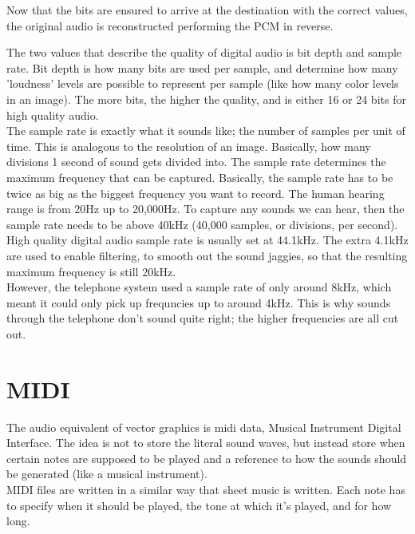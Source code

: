 Now that the bits are ensured to arrive at the destination with the correct values, the original audio is reconstructed performing the PCM in reverse.

\begin{center}\end{center}

The two values that describe the quality of digital audio is bit depth and sample rate. Bit depth is how many bits are used per sample, and determine how many 'loudness' levels are possible to represent per sample (like how many color levels in an image). The more bits, the higher the quality, and is either 16 or 24 bits for high quality audio.\\

The sample rate is exactly what it sounds like; the number of samples per unit of time. This is analogous to the resolution of an image. Basically, how many divisions 1 second of sound gets divided into. The sample rate determines the maximum frequency that can be captured. Basically, the sample rate has to be twice as big as the biggest frequency you want to record. The human hearing range is from 20Hz up to 20,000Hz. To capture any sounds we can hear, then the sample rate needs to be above 40kHz (40,000 samples, or divisions, per second). High quality digital audio sample rate is usually set at 44.1kHz. The extra 4.1kHz are used to enable filtering, to smooth out the sound jaggies, so that the resulting maximum frequency is still 20kHz.\\

However, the telephone system used a sample rate of only around 8kHz, which meant it could only pick up frequncies up to around 4kHz. This is why sounds through the telephone don't sound quite right; the higher frequencies are all cut out.

\section{MIDI}

The audio equivalent of vector graphics is midi data, Musical Instrument Digital Interface. The idea is not to store the literal sound waves, but instead store when certain notes are supposed to be played and a reference to how the sounds should be generated (like a musical instrument).\\

MIDI files are written in a similar way that sheet music is written. Each note has to specify when it should be played, the tone at which it's played, and for how long.



